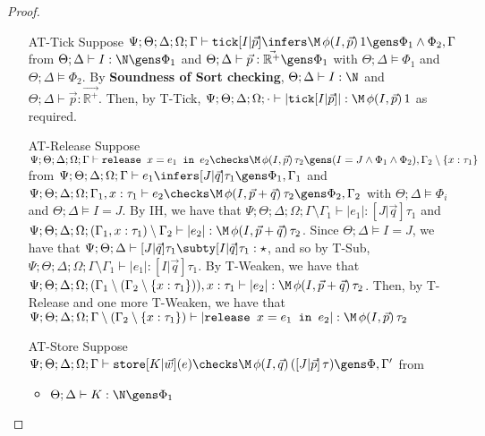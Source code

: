 \begin{proof}
\begin{enumerate}
  \item[AT-Tick] Suppose $\Psi ; \Theta ; \Delta ; \Omega ; \Gamma \vdash \texttt{tick}[I|\vec{p}] \infers \M \, \phi(I,\vec{p})\, 1 \gens \Phi_1 \wedge \Phi_2,\Gamma$ from $\Theta ; \Delta \vdash I : \N \gens \Phi_1$ and $\Theta ; \Delta \vdash \vec{p} : \vec{\mathbb{R}^+} \gens \Phi_1$ with $\Theta ; \Delta \vDash \Phi_1$ and $\Theta ; \Delta \vDash \Phi_2$. By \textbf{Soundness of Sort checking}, $\Theta ; \Delta \vdash I : \N$ and $\Theta ; \Delta \vdash \vec{p} : \vec{\mathbb{R}^+}$. Then, by T-Tick, $\Psi ; \Theta ; \Delta ; \Omega ; \cdot \vdash |\texttt{tick}[I|\vec{p}]| : \M \, \phi(I,\vec{p})\, 1$ as required.
  
  \item[AT-Release] Suppose $\Psi ; \Theta ; \Delta ; \Omega ; \Gamma \vdash \texttt{release } x = e_1 \texttt{ in }e_2 \checks \M \, \phi(I,\vec{p}) \, \tau_2 \gens (I = J \wedge \Phi_1 \wedge \Phi_2), \Gamma_2 \setminus \{x : \tau_1\}$ from $\Psi ; \Theta ; \Delta ; \Omega ; \Gamma \vdash e_1 \infers [J | \vec{q}] \tau_1 \gens \Phi_1,\Gamma_1$ and $\Psi ; \Theta ; \Delta ; \Omega ; \Gamma_1, x : \tau_1 \vdash e_2 \checks \M \, \phi(I,\vec{p} + \vec{q}) \, \tau_2 \gens \Phi_2, \Gamma_2$ with $\Theta ;  \Delta \vDash \Phi_i$ and $\Theta ; \Delta \vDash I = J$. By IH, we have that $\Psi ; \Theta ; \Delta ; \Omega ; \Gamma \setminus \Gamma_1 \vdash |e_1| : [J | \vec{q}] \tau_1$  and $\Psi ; \Theta ; \Delta ; \Omega ; (\Gamma_1, x : \tau_1) \setminus \Gamma_2 \vdash |e_2| : \M \, \phi(I,\vec{p} + \vec{q}) \, \tau_2$. Since $\Theta ; \Delta \vDash I = J$, we have that $\Psi ; \Theta ; \Delta \vdash [J|\vec{q}] \tau_1 \subty [I|\vec{q}] \tau_1 : \star$, and so by T-Sub, $\Psi ; \Theta ; \Delta ; \Omega ; \Gamma \setminus \Gamma_1 \vdash |e_1| : [I | \vec{q}] \tau_1$. By T-Weaken, we have that $\Psi ; \Theta ; \Delta ; \Omega ; (\Gamma_1 \setminus (\Gamma_2 \setminus \{x : \tau_1\})) , x : \tau_1 \vdash |e_2| : \M \, \phi(I,\vec{p} + \vec{q}) \, \tau_2$. Then, by T-Release and one more T-Weaken, we have that $\Psi ; \Theta ; \Delta ; \Omega ; \Gamma \setminus (\Gamma_2 \setminus \{x : \tau_1\}) \vdash |\texttt{release } x = e_1 \texttt{ in }e_2| : \M \, \phi(I,\vec{p}) \, \tau_2$
  \item[AT-Store] Suppose $\Psi ; \Theta ; \Delta ; \Omega ; \Gamma \vdash \texttt{store}[K|\vec{w}](e) \checks \M \, \phi(I,\vec{q}) \, ([J | \vec{p}] \, \tau) \gens \Phi, \Gamma'$ from
  \begin{itemize}
    \item $\Theta ; \Delta \vdash K : \N \gens \Phi_1$

\end{itemize}
\end{enumerate}
\end{proof}
